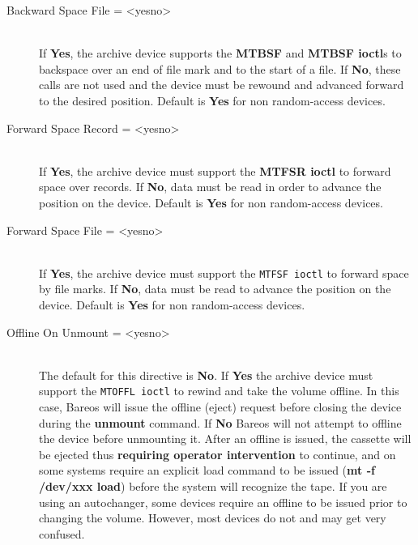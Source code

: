 \begin{description}
\item [Backward Space File = {\textless}yes{\textbar}no{\textgreater}] \hfill \\
If {\bf Yes}, the archive device supports the {\bf MTBSF} and  {\bf MTBSF
  ioctl}s to backspace over an end of file mark and to the  start of a file. If
  {\bf No}, these calls are not used and the  device must be rewound and
  advanced forward to the desired position.  Default is {\bf Yes} for non
  random-access devices.

\item [Forward Space Record = {\textless}yes{\textbar}no{\textgreater}] \hfill \\
If {\bf Yes}, the archive device must support the {\bf MTFSR  ioctl} to
forward space over records. If {\bf No}, data must  be read in order to
advance the position on the device. Default is  {\bf Yes} for non
random-access devices.

\item [Forward Space File = {\textless}yes{\textbar}no{\textgreater}] \hfill \\
If {\bf Yes}, the archive device must support the {\tt MTFSF  ioctl} to
forward space by file marks. If {\bf No}, data  must be read to advance the
position on the device. Default is  {\bf Yes} for non random-access devices.

\item [Offline On Unmount = {\textless}yes{\textbar}no{\textgreater}] \hfill \\
The default for this directive is {\bf No}. If {\bf Yes} the  archive device
must support the {\tt MTOFFL ioctl} to rewind and  take the volume offline. In
this case, Bareos will issue the  offline (eject) request before closing the
device during the {\bf unmount}  command. If {\bf No} Bareos will not attempt
to offline the  device before unmounting it. After an offline is issued,  the
cassette will be ejected thus {\bf requiring operator intervention}  to
continue, and on some systems require an explicit load command  to be issued
({\bf mt -f /dev/xxx load}) before the system will recognize  the tape. If you
are using an autochanger, some devices  require an offline to be issued prior
to changing the volume. However,  most devices do not and may get very
confused.


\end{description}
